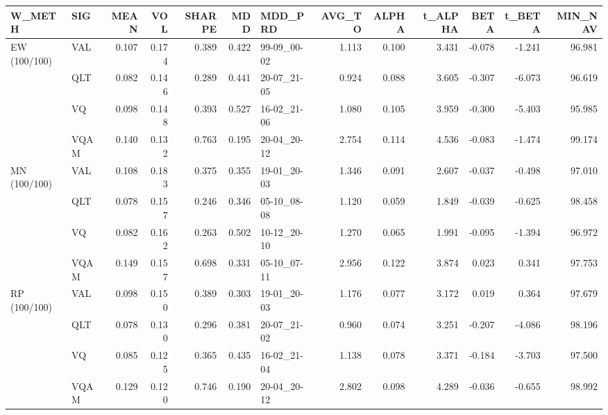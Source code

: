 \begin{tabular}{llrrrrlrrrrrr}
\toprule
W\_METH & SIG & MEAN & VOL & SHARPE & MDD & MDD\_PRD & AVG\_TO & ALPHA & t\_ALPHA & BETA & t\_BETA & MIN\_NAV \\
\midrule
EW (100/100) & VAL & 0.107 & 0.174 & 0.389 & 0.422 & 99-09\_00-02 & 1.113 & 0.100 & 3.431 & -0.078 & -1.241 & 96.981 \\
 & QLT & 0.082 & 0.146 & 0.289 & 0.441 & 20-07\_21-05 & 0.924 & 0.088 & 3.605 & -0.307 & -6.073 & 96.619 \\
 & VQ & 0.098 & 0.148 & 0.393 & 0.527 & 16-02\_21-06 & 1.080 & 0.105 & 3.959 & -0.300 & -5.403 & 95.985 \\
 & VQAM & 0.140 & 0.132 & 0.763 & 0.195 & 20-04\_20-12 & 2.754 & 0.114 & 4.536 & -0.083 & -1.474 & 99.174 \\
MN (100/100) & VAL & 0.108 & 0.183 & 0.375 & 0.355 & 19-01\_20-03 & 1.346 & 0.091 & 2.607 & -0.037 & -0.498 & 97.010 \\
 & QLT & 0.078 & 0.157 & 0.246 & 0.346 & 05-10\_08-08 & 1.120 & 0.059 & 1.849 & -0.039 & -0.625 & 98.458 \\
 & VQ & 0.082 & 0.162 & 0.263 & 0.502 & 10-12\_20-10 & 1.270 & 0.065 & 1.991 & -0.095 & -1.394 & 96.972 \\
 & VQAM & 0.149 & 0.157 & 0.698 & 0.331 & 05-10\_07-11 & 2.956 & 0.122 & 3.874 & 0.023 & 0.341 & 97.753 \\
RP (100/100) & VAL & 0.098 & 0.150 & 0.389 & 0.303 & 19-01\_20-03 & 1.176 & 0.077 & 3.172 & 0.019 & 0.364 & 97.679 \\
 & QLT & 0.078 & 0.130 & 0.296 & 0.381 & 20-07\_21-02 & 0.960 & 0.074 & 3.251 & -0.207 & -4.086 & 98.196 \\
 & VQ & 0.085 & 0.125 & 0.365 & 0.435 & 16-02\_21-04 & 1.138 & 0.078 & 3.371 & -0.184 & -3.703 & 97.500 \\
 & VQAM & 0.129 & 0.120 & 0.746 & 0.190 & 20-04\_20-12 & 2.802 & 0.098 & 4.289 & -0.036 & -0.655 & 98.992 \\
\bottomrule
\end{tabular}
